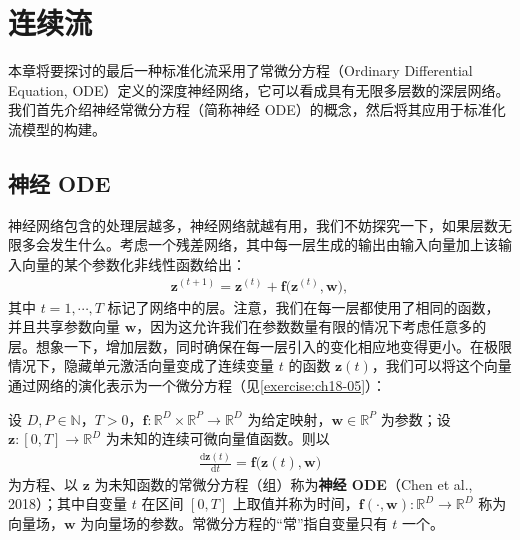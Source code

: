 \documentclass[../../main.tex]{subfiles}
\begin{document}
\section{连续流}\label{section:ch18-连续流}

本章将要探讨的最后一种标准化流采用了常微分方程（Ordinary Differential Equation, ODE）定义的深度神经网络，它可以看成具有无限多层数的深层网络。我们首先介绍神经常微分方程（简称神经 ODE）的概念，然后将其应用于标准化流模型的构建。

\subsection{神经 ODE}\label{subsection:ch18-神经ode}

神经网络包含的处理层越多，神经网络就越有用，我们不妨探究一下，如果层数无限多会发生什么。考虑一个残差网络，其中每一层生成的输出由输入向量加上该输入向量的某个参数化非线性函数给出：
\begin{align}
  \bm{z}^{(t+1)}=\bm{z}^{(t)}+\bm{f}\big(\bm{z}^{(t)},\bm{w}\big),\label{align:ch18-残差}
\end{align}
其中 $t=1,\cdots,T$ 标记了网络中的层。注意，我们在每一层都使用了相同的函数，并且共享参数向量 $\bm{w}$，因为这允许我们在参数数量有限的情况下考虑任意多的层。想象一下，增加层数，同时确保在每一层引入的变化相应地变得更小。在极限情况下，隐藏单元激活向量变成了连续变量 $t$ 的函数 $\bm{z}(t)$，我们可以将这个向量通过网络的演化表示为一个微分方程（见\cref{exercise:ch18-05}）：

\begin{definition}[神经 ODE]\label{definition:ch18-神经ode}
设 $D,P\in\mathbb{N}$，$T>0$，$\bm{f}:\mathbb{R}^{D}\times\mathbb{R}^{P}\to\mathbb{R}^{D}$ 为给定映射，$\bm{w}\in\mathbb{R}^{P}$ 为参数；设 $\bm{z}:[0,T]\to\mathbb{R}^{D}$ 为未知的连续可微向量值函数。则以
\begin{align}
  \frac{\mathrm{d}\bm{z}(t)}{\mathrm{d}t}=\bm{f}\big(\bm{z}(t),\bm{w}\big)\label{align:ch18-神经ode}
\end{align}
为方程、以 $\bm{z}$ 为未知函数的常微分方程（组）称为\textbf{神经 ODE}（Chen et al., 2018）；其中自变量 $t$ 在区间 $[0,T]$ 上取值并称为时间，$\bm{f}(\cdot,\bm{w}):\mathbb{R}^{D}\to\mathbb{R}^{D}$ 称为向量场，$\bm{w}$ 为向量场的参数。常微分方程的“常”指自变量只有 $t$ 一个。
\end{definition}
\end{document}
